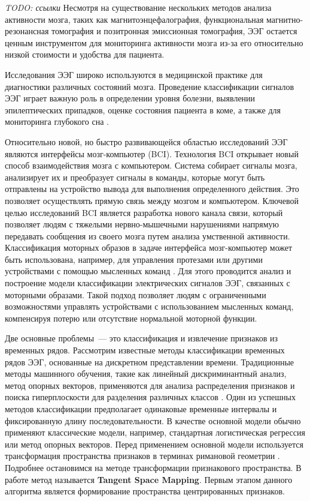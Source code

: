 \documentclass[a4paper, 12pt]{extarticle}
\begin{document}
\textit{TODO: ссылки} Несмотря на существование нескольких методов анализа активности мозга, таких как магнитоэнцефалография, 
функциональная магнитно-резонансная томография и позитронная эмиссионная томография, 
ЭЭГ остается ценным инструментом для мониторинга активности мозга из-за его относительно низкой стоимости и удобства для пациента.

Исследования ЭЭГ широко используются в медицинской практике для диагностики 
различных состояний мозга. Проведение классификации сигналов ЭЭГ играет важную роль в определении 
уровня болезни, выявлении эпилептических припадков, оценке состояния пациента в коме, а 
также для мониторинга глубокого сна \citep{smith2005eeg, gajic2014classification}.

Относительно новой, но быстро развивающейся областью исследований ЭЭГ являются интерфейсы мозг-компьютер (BCI). 
Технология BCI открывает новый способ взаимодействия мозга с компьютером. 
Система собирает сигналы мозга, анализирует их и преобразует сигналы в команды, которые могут быть отправлены на устройство 
вывода для выполнения определенного действия. 
Это позволяет осуществлять прямую связь между мозгом и компьютером. 
Ключевой целью исследований BCI является разработка нового канала связи, 
который позволяет людям с тяжелыми нервно-мышечными нарушениями напрямую передавать сообщения из своего мозга путем анализа умственной активности. 
Классификация моторных образов в задаче интерфейса мозг-компьютер может быть использована, например, для управления протезами или другими устройствами с 
помощью мысленных команд \citep{song2020assistive, cruz2021self, schwarz2020decoding}. 
Для этого проводится анализ и построение модели классификации электрических сигналов ЭЭГ, связанных с моторными образами. 
Такой подход позволяет людям с ограниченными возможностями управлять устройствами с использованием мысленных команд, 
компенсируя потерю или отсутствие нормальной моторной функции.

Две основные проблемы~--- это классификация и извлечение признаков из временных рядов.
Рассмотрим известные методы классификации временных рядов ЭЭГ, основанные на дискретном представлении времени.
Традиционные методы машинного обучения, такие как линейный дискриминантный анализ, метод опорных векторов, применяются для
анализа распределения признаков и поиска гиперплоскости для разделения различных классов \citep{fu2019improvement, liu2012automatic}. 
Один из успешных методов классификации предполагает одинаковые временные интервалы и фиксированную длину последовательности. 
В качестве основной модели обычно применяют классические модели, например, стандартная логистическая регрессия или метод опорных векторов.
Перед применением основной модели используется трансформация пространства признаков в терминах римановой геометрии \citep{barachant2010riemannian, barachant2011multiclass}.
Подробнее остановимся на методе трансформации признакового пространства. 
В работе \citep{barachant2011multiclass} метод называется \textbf{Tangent Space Mapping}.
Первым этапом данного алгоритма является формирование пространства центрированных признаков.
\end{document}
